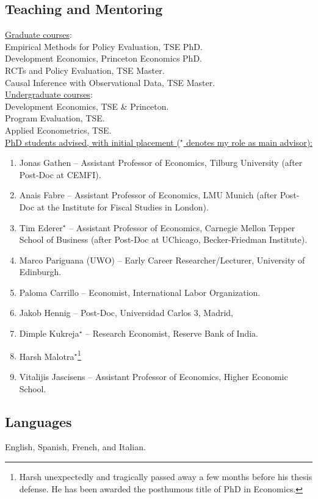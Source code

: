 \documentclass[12pt,english]{article}
\newcommand\reverselabel[1]{%
  \def\theenumi{}%
  \renewcommand\makelabel{\makebox[\dimexpr\labelwidth-3pt\relax][r]{%
    \the\numexpr#1-\value{enumi}+1\relax}}}%
\begin{document}
\subsection*{Teaching and Mentoring}
\underline{Graduate courses}: \\
Empirical Methods for Policy Evaluation, TSE PhD.\vspace{0.2cm} \\
Development Economics, Princeton Economics PhD.\vspace{0.2cm} \\
RCTs and Policy Evaluation, TSE Master. \vspace{0.2cm} \\
Causal Inference with Observational Data, TSE Master. \\

\noindent \underline{Undergraduate courses}: \\
Development Economics, TSE \& Princeton. \vspace{0.2cm}\\
Program Evaluation, TSE. \vspace{0.2cm}\\
Applied Econometrics, TSE. \\

\noindent \underline{PhD students advised, with initial placement ($^\star$ denotes my role as main advisor):} 
\begin{enumerate}\reverselabel{9}
\item Jonas Gathen -- Assistant Professor of Economics, Tilburg University (after Post-Doc at CEMFI).
\item Anais Fabre -- Assistant Professor of Economics, LMU Munich (after Post-Doc at the Institute for Fiscal Studies in London).
\item Tim Ederer$^\star$ -- Assistant Professor of Economics, Carnegie Mellon Tepper School of Business (after Post-Doc at UChicago, Becker-Friedman Institute).
\item Marco Pariguana (UWO) -- Early Career Researcher/Lecturer, University of Edinburgh.
\item Paloma Carrillo -- Economist, International Labor Organization.
\item Jakob Hennig -- Post-Doc, Universidad Carlos 3, Madrid,
\item Dimple Kukreja$^\star$ --  Research Economist, Reserve Bank of India.
\item Harsh Malotra$^\star$\footnote{Harsh unexpectedly and tragically passed away a few months before his thesis defense. He has been awarded the posthumous title of PhD in Economics.} 
\item Vitalijis Jascisens -- Assistant Professor of Economics, Higher Economic School.
\end{enumerate}

\subsection*{Languages}
English, Spanish, French, and Italian.
\end{document}
